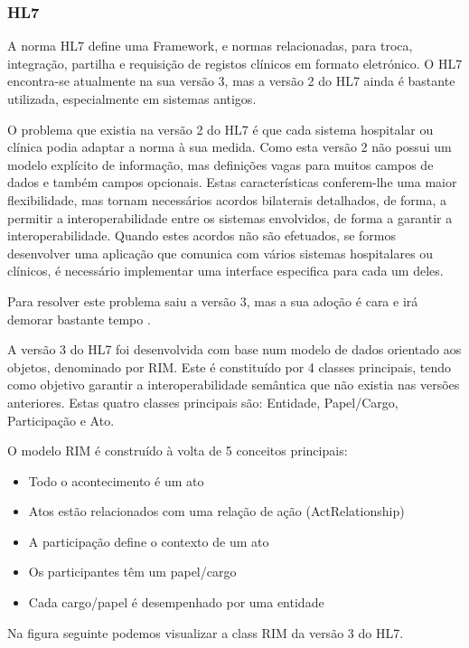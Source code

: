 \subsubsection{HL7}

A norma HL7 define uma Framework, e normas relacionadas, para troca, integração, partilha e requisição de  registos clínicos em formato eletrónico\cite{hl7}.
O HL7 encontra-se atualmente na sua versão 3\cite{corepointhealth}, mas a versão 2 do \gls{HL7} ainda é bastante utilizada, especialmente em sistemas antigos. 
\par
O problema que existia na versão 2 do \gls{HL7} é que cada sistema hospitalar ou clínica podia adaptar a norma à sua medida. Como esta versão 2 não possui um modelo explícito de informação, mas definições vagas para muitos campos de dados e também campos opcionais. Estas características conferem-lhe uma maior flexibilidade, mas tornam necessários acordos bilaterais detalhados, de forma, a permitir a interoperabilidade entre os sistemas envolvidos, de forma a garantir a interoperabilidade. Quando estes acordos não são efetuados, se formos desenvolver uma aplicação que comunica com vários  sistemas hospitalares ou clínicos, é necessário implementar uma interface especifica para cada um deles.
\par
Para resolver este problema saiu a versão 3, mas a sua adoção é cara e irá demorar bastante tempo \cite{corepointhealth}.

A versão 3 do HL7 foi desenvolvida com base num modelo de dados orientado aos objetos, denominado por \gls{RIM}. Este é constituído por 4 classes principais, tendo como objetivo garantir a interoperabilidade semântica que não existia nas versões anteriores. Estas quatro classes principais são: Entidade, Papel/Cargo, Participação e Ato\cite{hl7-rim}.
\par 
O modelo \gls{RIM} é construído à volta de 5 conceitos principais:
\begin{itemize}
  \item Todo o acontecimento é um ato
  \item Atos estão relacionados com uma relação de ação (ActRelationship)
  \item A participação define o contexto de um ato
  \item Os participantes têm um papel/cargo
  \item Cada cargo/papel é desempenhado por uma entidade
\end{itemize}

Na figura seguinte podemos visualizar a class \gls{RIM} da versão 3 do HL7.

